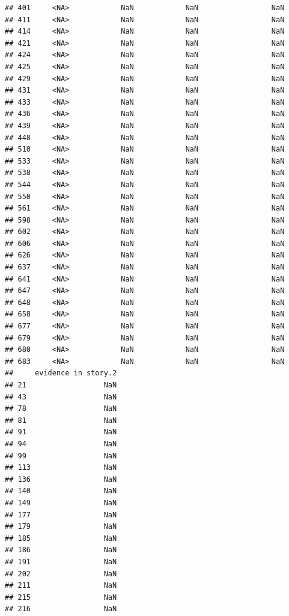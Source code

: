 \documentclass[
]{article}
\begin{document}
\begin{verbatim}
## 401     <NA>            NaN            NaN                 NaN
## 411     <NA>            NaN            NaN                 NaN
## 414     <NA>            NaN            NaN                 NaN
## 421     <NA>            NaN            NaN                 NaN
## 424     <NA>            NaN            NaN                 NaN
## 425     <NA>            NaN            NaN                 NaN
## 429     <NA>            NaN            NaN                 NaN
## 431     <NA>            NaN            NaN                 NaN
## 433     <NA>            NaN            NaN                 NaN
## 436     <NA>            NaN            NaN                 NaN
## 439     <NA>            NaN            NaN                 NaN
## 448     <NA>            NaN            NaN                 NaN
## 510     <NA>            NaN            NaN                 NaN
## 533     <NA>            NaN            NaN                 NaN
## 538     <NA>            NaN            NaN                 NaN
## 544     <NA>            NaN            NaN                 NaN
## 550     <NA>            NaN            NaN                 NaN
## 561     <NA>            NaN            NaN                 NaN
## 598     <NA>            NaN            NaN                 NaN
## 602     <NA>            NaN            NaN                 NaN
## 606     <NA>            NaN            NaN                 NaN
## 626     <NA>            NaN            NaN                 NaN
## 637     <NA>            NaN            NaN                 NaN
## 641     <NA>            NaN            NaN                 NaN
## 647     <NA>            NaN            NaN                 NaN
## 648     <NA>            NaN            NaN                 NaN
## 658     <NA>            NaN            NaN                 NaN
## 677     <NA>            NaN            NaN                 NaN
## 679     <NA>            NaN            NaN                 NaN
## 680     <NA>            NaN            NaN                 NaN
## 683     <NA>            NaN            NaN                 NaN
##     evidence in story.2
## 21                  NaN
## 43                  NaN
## 78                  NaN
## 81                  NaN
## 91                  NaN
## 94                  NaN
## 99                  NaN
## 113                 NaN
## 136                 NaN
## 140                 NaN
## 149                 NaN
## 177                 NaN
## 179                 NaN
## 185                 NaN
## 186                 NaN
## 191                 NaN
## 202                 NaN
## 211                 NaN
## 215                 NaN
## 216                 NaN

\end{verbatim}
\end{document}
